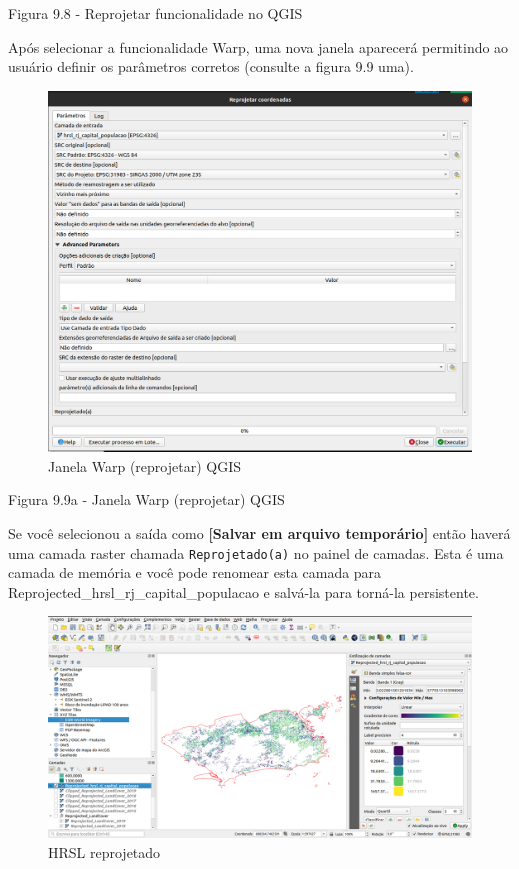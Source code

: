 \documentclass[
]{krantz}
\begin{document}
Figura 9.8 - Reprojetar funcionalidade no QGIS

Após selecionar a funcionalidade Warp, uma nova janela aparecerá permitindo ao usuário definir os parâmetros corretos (consulte a figura 9.9 uma).

\begin{figure}
\centering
\includegraphics{media/modulo9/fig99_a.png}
\caption{Janela Warp (reprojetar) QGIS}
\end{figure}

Figura 9.9a - Janela Warp (reprojetar) QGIS

Se você selecionou a saída como \textbf{{[}Salvar em arquivo temporário{]}} então haverá uma camada raster chamada \texttt{Reprojetado(a)} no painel de camadas. Esta é uma camada de memória e você pode renomear esta camada para Reprojected\_hrsl\_rj\_capital\_populacao e salvá-la para torná-la persistente.

\begin{figure}
\centering
\includegraphics{media/modulo9/fig99_b.png}
\caption{HRSL reprojetado}
\end{figure}
\end{document}
